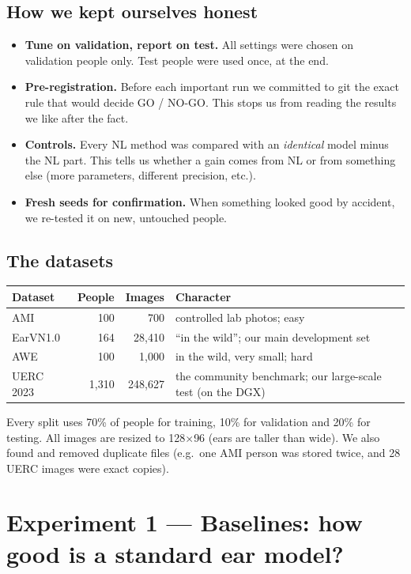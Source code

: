 \documentclass[11pt,a4paper]{article}
\begin{document}
\subsection{How we kept ourselves honest}
\begin{itemize}
  \item \textbf{Tune on validation, report on test.} All settings were chosen on validation people only. Test people were used once, at the end.
  \item \textbf{Pre-registration.} Before each important run we committed to git the exact rule that would decide GO / NO-GO. This stops us from reading the results we like after the fact.
  \item \textbf{Controls.} Every NL method was compared with an \emph{identical} model minus the NL part. This tells us whether a gain comes from NL or from something else (more parameters, different precision, etc.).
  \item \textbf{Fresh seeds for confirmation.} When something looked good by accident, we re-tested it on new, untouched people.
\end{itemize}

\subsection{The datasets}
\begin{center}
\begin{tabular}{@{}lrrl@{}}
\toprule
\textbf{Dataset} & \textbf{People} & \textbf{Images} & \textbf{Character}\\
\midrule
AMI & 100 & 700 & controlled lab photos; easy\\
EarVN1.0 & 164 & 28{,}410 & ``in the wild''; our main development set\\
AWE & 100 & 1{,}000 & in the wild, very small; hard\\
UERC 2023 & 1{,}310 & 248{,}627 & the community benchmark; our large-scale test (on the DGX)\\
\bottomrule
\end{tabular}
\end{center}
Every split uses 70\% of people for training, 10\% for validation and 20\% for testing. All images are resized to 128$\times$96 (ears are taller than wide). We also found and removed duplicate files (e.g.\ one AMI person was stored twice, and 28 UERC images were exact copies).

\section{Experiment 1 --- Baselines: how good is a standard ear model?}
\end{document}
